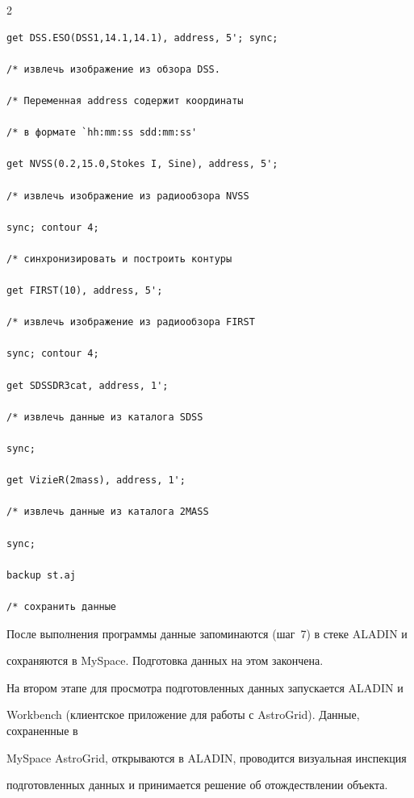 \begin{multicols}{2}
{\begin{verbatim}
get DSS.ESO(DSS1,14.1,14.1), address, 5'; sync; 

/* извлечь изображение из обзора DSS. 

/* Переменная address содержит координаты 

/* в формате `hh:mm:ss sdd:mm:ss'

get NVSS(0.2,15.0,Stokes I, Sine), address, 5'; 

/* извлечь изображение из радиообзора NVSS

sync; contour 4;                                

/* синхронизировать и построить контуры

get FIRST(10), address, 5';                     

/* извлечь изображение из радиообзора FIRST

sync; contour 4;                               

get SDSSDR3cat, address, 1';                    

/* извлечь данные из каталога SDSS

sync; 

get VizieR(2mass), address, 1';                 

/* извлечь данные из каталога 2MASS

sync;

backup st.aj                                    

/* сохранить данные

\end{verbatim}



}







      

После выполнения программы данные запоминаются (шаг~7) в стеке ALADIN и 

сохраняются в MySpace. Подготовка данных на этом закончена. 



      На втором этапе для просмотра подготовленных данных запускается ALADIN и 

Workbench (клиентское приложение для работы с AstroGrid). Данные, сохраненные в 

MySpace AstroGrid, открываются в ALADIN, проводится визуальная инспекция 

подготовленных данных и принимается решение об отождествлении объекта. 


\end{multicols}
